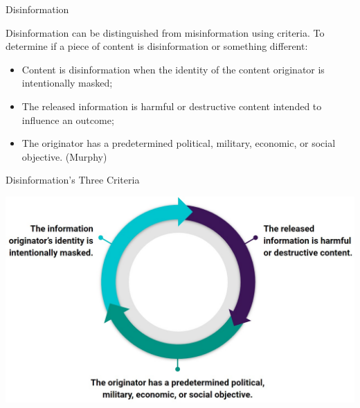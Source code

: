 \documentclass[nobackground,dvipsnames,table]{beamer}
\begin{document}
\begin{frame}{Disinformation}

Disinformation can be distinguished from misinformation using criteria.  To determine if a piece of content is disinformation or something different:
\begin{itemize}
    \item Content is disinformation when the identity of the content originator is intentionally masked; 
    \item The released information is harmful or destructive content intended to influence an outcome; 
    \item The originator has a predetermined political, military, economic, or social objective. (Murphy)
\end{itemize}

\end{frame}


\begin{frame}{Disinformation’s Three Criteria}

\includegraphics[width=\textwidth]{img/fig1.jpg}

\end{frame}
\end{document}
